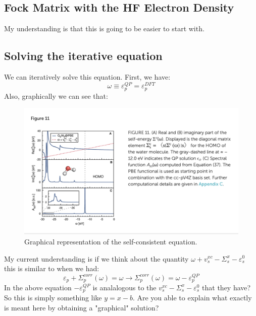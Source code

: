 \documentclass[12pt]{article}
\begin{document}
\subsection{Fock Matrix with the HF Electron Density}
My understanding is that this is going to be easier to start with.
\subsection{Solving the iterative equation}
We can iteratively solve this equation. First, we have:
\begin{equation}
   \omega \equiv  \varepsilon_{p}^{QP} = \varepsilon_{p}^{DFT}
\end{equation}
\newpage
Also, graphically we can see that:
\begin{figure}[h]
    \centering
    \includegraphics[width=\textwidth]{water.png}
    \caption{Graphical representation of the self-consistent equation.}
    \label{fig:my_label}
\end{figure}
My current understanding is if we think about the quantity $\omega + v_{s}^{xc}- \Sigma _{s}^{x}- \varepsilon _{s}^{0}$ this is similar to when we had:
\begin{equation}
    \varepsilon _{p}+\Sigma _{p}^{corr}(\omega )=\omega \rightarrow \Sigma _{p}^{corr}(\omega ) = \omega -\varepsilon _{p}^{QP}
\end{equation}
In the above equation $-\varepsilon _{p}^{QP}$ is analalogous to the $v_{s}^{xc}- \Sigma _{s}^{x}- \varepsilon _{s}^{0}$ that they have?
So this is simply something like $y=x-b$. Are you able to explain what exactly is meant here by obtaining a "graphical" solution?
\end{document}
